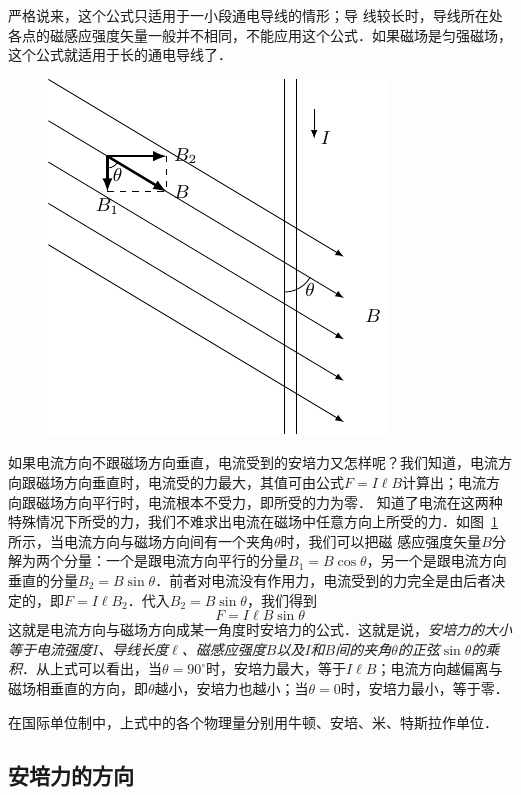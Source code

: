 严格说来，这个公式只适用于一小段通电导线的情形；导
线较长时，导线所在处各点的磁感应强度矢量一般并不相同，不能应用这个公式．如果磁场是匀强磁场，这个公式就适用于长的通电导线了．
\begin{figure}[htbp]
    \centering
    \includegraphics{fig/C/1-21.pdf}
    \caption{}\label{fig_C_1-21}
\end{figure}

如果电流方向不跟磁场方向垂直，电流受到的安培力又怎样呢？我们知道，电流方向跟磁场方向垂直时，电流受的力最大，其值可由公式$F=I\ell B$计算出；电流方向跟磁场方向平行时，电流根本不受力，即所受的力为零．
知道了电流在这两种特殊情况下所受的力，我们不难求出电流在磁场中任意方向上所受的力．如图~\ref{fig_C_1-21} 所示，当电流方向与磁场方向间有一个夹角$\theta$时，我们可以把磁
感应强度矢量$B$分解为两个分量：一个是跟电流方向平行的分量$B_1=B\cos\theta$，另一个是跟电流方向垂直的分量$B_2=B\sin\theta$．前者对电流没有作用力，电流受到的力完全是由后者决定的，即$F=I\ell B_2$．代入$B_2=B\sin\theta$，我们得到
\[F=I\ell B\sin\theta\]
这就是电流方向与磁场方向成某一角度时安培力的公式．这就是说，\textit{安培力的大小等于电流强度$I$、导线长度$\ell$、磁感应强度$B$以及$I$和$B$间的夹角$\theta$的正弦$\sin\theta$的乘积}．从上式可以看出，当$\theta =90^{\circ}$时，安培力最大，等于$I\ell B$；电流方向越偏离与磁场相垂直的方向，即$\theta$越小，安培力也越小；当$\theta =0$时，安培力最小，等于零．

在国际单位制中，上式中的各个物理量分别用牛顿、安培、米、特斯拉作单位．

\subsection{安培力的方向}



